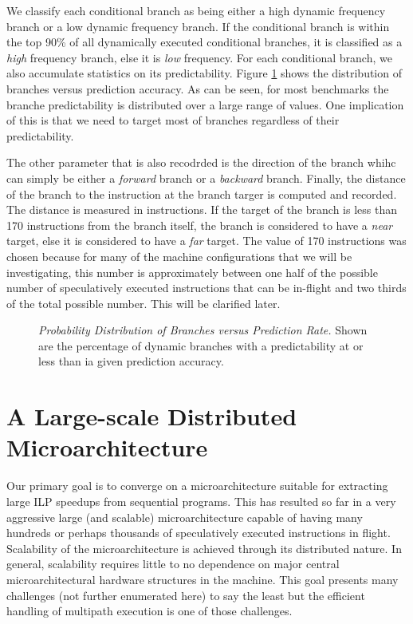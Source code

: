 \documentclass[10pt,dvips]{article}
\begin{document}
We classify each conditional branch as 
being either a high dynamic frequency branch
or a low dynamic frequency branch.  
If the conditional branch
is within the top 90\% of all dynamically executed conditional branches,
it is classified as a \textit{high} frequency branch, else it 
is \textit{low} frequency.
For each conditional branch, we also accumulate statistics on
its predictability.  Figure \ref{fig:bpdist} shows 
the distribution of branches versus prediction accuracy.
As can be seen, for most benchmarks
the branche predictability is distributed over a large range of values.
One implication of this is that we need to target most of branches 
regardless of their predictability.

The other parameter that is also recodrded is the direction of the branch 
whihc can simply
be either a 
\textit{forward} branch or a 
\textit{backward} branch.
Finally, the distance of the branch to 
the instruction at the
branch targer is computed and recorded.  The distance is measured
in instructions.  If the target of the branch is less than 170 instructions
from the branch itself, the branch is considered to have a 
\textit{near} target, else it is considered to have a
\textit{far} target.  The value of 170 instructions was chosen
because for many of the machine configurations that we will be
investigating, this number is approximately between one half of
the possible number of speculatively executed instructions
that can be in-flight and two thirds of the total possible number.
This will be clarified later.

\begin{figure}
\vspace{0.2 in}
\setlength{\epsfxsize}{10cm}%
\centerline{}
\caption{{\em Probability Distribution of Branches versus Prediction Rate.} 
Shown are the percentage of dynamic
branches with a predictability at or less than ia given prediction
accuracy.}
\label{fig:bpdist}
\end{figure}
%
\section{A Large-scale Distributed Microarchitecture}
%
Our primary goal is to converge on a microarchitecture suitable
for extracting large ILP speedups from sequential programs.
This has resulted so far in a very aggressive large (and scalable)
microarchitecture capable of having many hundreds or perhaps thousands
of speculatively executed instructions in flight.  Scalability
of the microarchitecture is achieved through its distributed nature.
In general, scalability requires little to no dependence on major
central microarchitectural hardware structures in the machine.
This goal presents many challenges (not further enumerated here)
to say the least but the efficient handling of multipath execution
is one of those challenges.  
\end{document}
